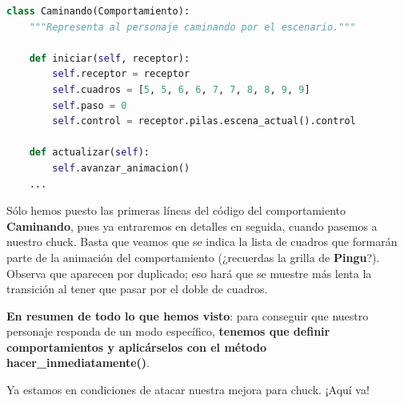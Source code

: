 \documentclass{article}
\begin{document}
\clearpage
\begin{lstlisting}[language=Python]
class Caminando(Comportamiento):
    """Representa al personaje caminando por el escenario."""

    def iniciar(self, receptor):
        self.receptor = receptor
        self.cuadros = [5, 5, 6, 6, 7, 7, 8, 8, 9, 9]
        self.paso = 0
        self.control = receptor.pilas.escena_actual().control

    def actualizar(self):
        self.avanzar_animacion()
    ...
\end{lstlisting}
\vspace{\baselineskip}

Sólo hemos puesto las primeras líneas del código del comportamiento \textbf{Caminando}, pues ya entraremos en detalles en seguida, cuando pasemos a nuestro chuck. Basta que veamos que se indica la lista de cuadros que formarán parte de la animación del comportamiento (¿recuerdas la grilla de \textbf{Pingu}?). Observa que aparecen por duplicado; eso hará que se muestre más lenta la transición al tener que pasar por el doble de cuadros.\par
\textbf{En resumen de todo lo que hemos visto}: para conseguir que nuestro personaje responda de un modo específico, \textbf{tenemos que definir comportamientos y aplicárselos con el método hacer\_inmediatamente()}.\par
Ya estamos en condiciones de atacar nuestra mejora para chuck. ¡Aquí va!\par
\end{document}

